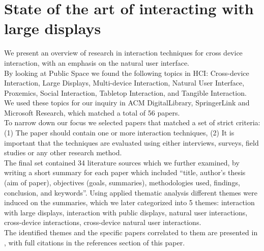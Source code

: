\section{State of the art of interacting with large displays}
We present an overview of research in interaction techniques for cross device interaction, with an emphasis on the natural user interface.\\
By looking at Public Space we found the following topics in HCI: Cross-device Interaction, Large Displays, Multi-device Interaction, Natural User Interface, Proxemics, Social Interaction, Tabletop Interaction, and Tangible Interaction. \\
We used these topics for our inquiry in ACM DigitalLibrary, SpringerLink and Microsoft Research, which matched a total of 56 papers. \\
To narrow down our focus we selected papers that matched a set of strict criteria: (1) The paper should contain one or more interaction techniques, (2) It is important that the techniques are evaluated using either interviews, surveys, field studies or any other research method.\\
The final set contained 34 literature sources which we further examined, by writing a short summary for each paper which included ``title, author's thesis (aim of paper), objectives (goals, summaries), methodologies used, findings, conclusion, and keywords''. 
Using applied thematic analysis different themes were induced on the summaries, which we later categorized into 5 themes: interaction with large displays, interaction with public displays, natural user interactions, cross-device interactions, cross-device natural user interactions.\\
The identified themes and the specific papers correlated to them are presented in , with full citations in the references section of this paper. 


